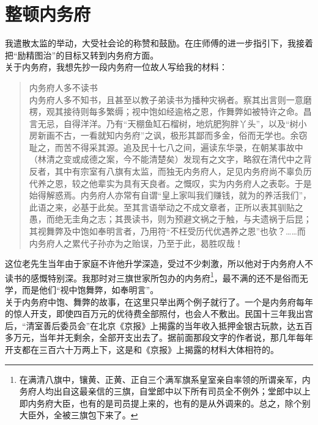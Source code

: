 \fancyhead[RO]{} %
\fancyhead[LE]{} %
\chapter*{整顿内务府}
\thispagestyle{empty}
我遣散太监的举动，大受社会论的称赞和鼓励。在庄师傅的进一步指引下，我接着把“励精图治”的目标又转到内务府方面。\\

关于内务府，我想先抄一段内务府一位故人写给我的材料：\\

\begin{quote}
	内务府人多不读书\\

内务府人多不知书，且甚至以教子弟读书为播种灾祸者。察其出言则一意磨楞，观其接待则每多繁缛；视中饱如经逾格之恩，作舞弊如被特许之命。昌言无忌，自得洋洋。乃有“天棚鱼缸石榴树，地炕肥狗胖丫头”，以及“树小房新画不古，一看就知内务府”之讽，极形其鄙而多金，俗而无学也。余窃耻之，而苦不得采其源。追及民十七八之间，遍读东华录，在朝某事故中（林清之变或成德之案，今不能清楚矣）发现有之文字，略叙在清代中之背反者，其中有宗室有八旗有太监，而独无内务府人，足见内务府尚不辜负历代养之恩，较之他辈实为具有天良者。之慨叹，实为内务府人之表彰。于是始得解惑焉。内务府人亦常有自谓“皇上家叫我们赚钱，就为的养活我们”，此语之来，必基于此矣。至其言语举动之不成文章者，正所以表其驯贴之愚，而绝无圭角之志；其畏读书，则为预避文祸之于触，与夫遗祸于后昆；其视舞弊及中饱如奉明言者，乃用符“不枉受历代优遇养之恩”也欤？……而内务府人之累代子孙亦为之贻误，乃至于此，曷胜叹哉！\\
\end{quote}

这位老先生当年由于家庭不许他升学深造，受过不少刺激，所以他对于内务府人不读书的感慨特别深。我那时对三旗世家所包办的内务府\footnote{在满清八旗中，镶黄、正黄、正自三个满军旗系皇室亲自率领的所谓亲军，内务府人均出自这最亲信的三旗，自堂郎中以下所有司员全不例外；堂郎中以上即内务府大臣，也有的是司员提上来的，也有的是从外调来的。总之，除个别大臣外，全被三旗包下来了。}，最不满的还不是俗而无学，而是他们“视中饱舞弊，如奉明言”。\\

关于内务府中饱、舞弊的故事，在这里只举出两个例子就行了。一个是内务府每年的惊人开支，即使四百万元的优待费全部照付，也会人不敷出。民国十三年我出宫后，“清室善后委员会”在北京《京报》上揭露的当年收入抵押金银古玩款，达五百多万元，当年并无剩余，全部开支出去了。据前面那段文字的作者说，那几年每年开支都在三百六十万两上下，这是和《京报》上揭露的材料大体相符的。\\

